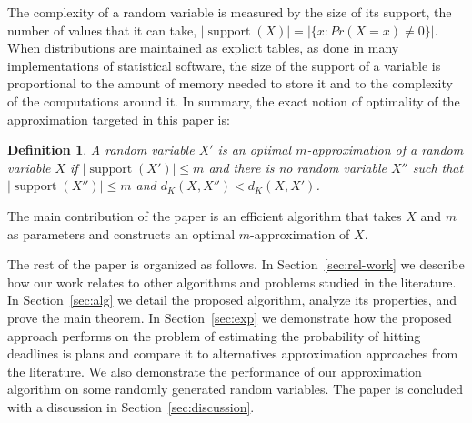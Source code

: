 \documentclass{article}
\newtheorem{definition}[thm]{Definition}
\newtheorem{theorem}[thm]{Theorem}
\DeclareMathOperator{\support}{support}
\begin{document}
	The complexity of a random variable is measured by the size of its support, the number of values that it can take, $|\support(X)|=|\{x\colon Pr(X=x) \neq 0\}|$. When distributions are maintained as explicit tables, as done in many implementations of statistical software, the size of the support of a variable is proportional to the amount of memory needed to store it and to the complexity of the computations around it. In summary, the exact notion of optimality of the approximation targeted in this paper is:
	\begin{definition}
		A random variable $X'$ is an optimal $m$-approximation of a random variable $X$ if $|\support(X')| \leq m$ and there is no random variable $X''$ such that $|\support(X'')| \leq m$ and $d_K(X,X'') < d_K(X,X')$.
	\end{definition}
	
	The main contribution of the paper is an efficient algorithm that takes $X$ and $m$ as parameters and constructs an optimal $m$-approximation of $X$.
	
	
	The rest of the paper is organized as follows. In Section~\ref{sec:rel-work} we describe how our work relates to other algorithms and problems studied in the literature. In Section~\ref{sec:alg} we detail the proposed algorithm, analyze its properties, and prove the main theorem. In Section~\ref{sec:exp} we demonstrate how the proposed approach performs on the problem of estimating the probability of hitting deadlines is plans and compare it to alternatives approximation approaches from the literature. We also demonstrate the performance of our approximation algorithm on some randomly generated random variables. The paper is concluded with a discussion in Section~\ref{sec:discussion}.
	
\end{document}
